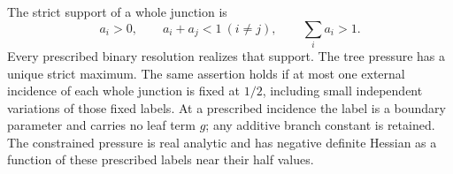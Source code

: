 \begin{lemma}
\label{ms:pressure-existence}
The strict support of a whole junction is
\begin{equation}\label{ms:whole-support}
 a_i>0,\qquad a_i+a_j<1\ (i\ne j),\qquad \sum_i a_i>1.
\end{equation}
Every prescribed binary resolution realizes that support. The tree
pressure has a unique strict maximum. The same assertion holds if
at most one external incidence of each whole junction is fixed at
$1/2$, including small independent variations of those fixed labels.
At a prescribed incidence the label is a boundary parameter and
carries no leaf term $g$; any additive branch constant is retained.
The constrained pressure is real analytic and has negative definite
Hessian as a function of these prescribed labels near their half values.
\end{lemma}
